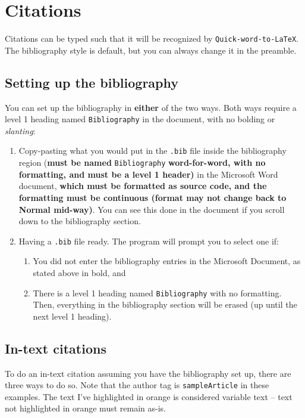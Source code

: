 \documentclass[
]{article}
\theoremstyle{plain}
\theoremstyle{remark}
\theoremstyle{definition}
\begin{document}
\section{Citations}

Citations can be typed such that it will be recognized by
\texttt{Quick-word-to-LaTeX}. The bibliography style is default, but you
can always change it in the preamble.


\subsection{Setting up the
bibliography}

You can set up the bibliography in \textbf{either} of the two ways. Both
ways require a level 1 heading named \texttt{Bibliography} in the
document, with no bolding or \emph{slanting}:

\begin{enumerate}
\def\labelenumi{\arabic{enumi}.}
\item
  Copy-pasting what you would put in the \texttt{.bib} file inside the
  bibliography region (\textbf{must be named} \texttt{Bibliography}
  \textbf{word-for-word, with no formatting, and must be a level 1
  header)} in the Microsoft Word document, \textbf{which must be
  formatted as source code, and the formatting must be continuous
  (format may not change back to Normal mid-way)}. You can see this done
  in the document if you scroll down to the bibliography section.
\item
  Having a \texttt{.bib} file ready. The program will prompt you to
  select one if:

  \begin{enumerate}
  \def\labelenumii{\alph{enumii}.}
  \item
    You did not enter the bibliography entries in the Microsoft
    Document, as stated above in bold, and
  \item
    There is a level 1 heading named \texttt{Bibliography} with no
    formatting. Then, everything in the bibliography section will be
    erased (up until the next level 1 heading).
  \end{enumerate}
\end{enumerate}


\subsection{In-text citations}

To do an in-text citation assuming you have the bibliography set up,
there are three ways to do so. Note that the author tag is
\texttt{sampleArticle} in these examples. The text I've highlighted in
orange is considered variable text -- text not highlighted in orange
must remain as-is.
\end{document}
